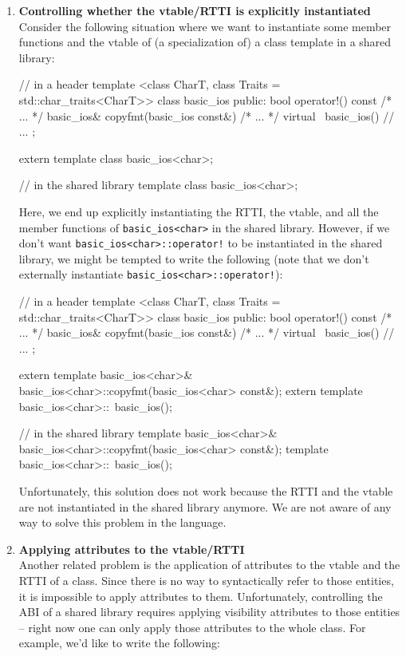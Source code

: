 \documentclass{wg21}
\newcommand{\cc}[1]{\texttt{#1}}
\begin{document}
\begin{enumerate}
  \item \textbf{Controlling whether the vtable/RTTI is explicitly instantiated}\\
  Consider the following situation where we want to instantiate some member
  functions and the vtable of (a specialization of) a class template in a
  shared library:

  \begin{cpp}
  // in a header
  template <class CharT, class Traits = std::char_traits<CharT>>
  class basic_ios {
  public:
    bool operator!() const { /* ... */ }
    basic_ios& copyfmt(basic_ios const&) { /* ... */ }
    virtual ~basic_ios() { }
    // ...
  };

  extern template class basic_ios<char>;

  // in the shared library
  template class basic_ios<char>;
  \end{cpp}

  Here, we end up explicitly instantiating the RTTI, the vtable, and all the
  member functions of \cc{basic_ios<char>} in the shared library. However, if
  we don't want \cc{basic_ios<char>::operator!} to be instantiated in the
  shared library, we might be tempted to write the following (note that we
  don't externally instantiate \cc{basic_ios<char>::operator!}):

  \begin{cpp}
  // in a header
  template <class CharT, class Traits = std::char_traits<CharT>>
  class basic_ios {
  public:
    bool operator!() const { /* ... */ }
    basic_ios& copyfmt(basic_ios const&) { /* ... */ }
    virtual ~basic_ios() { }
    // ...
  };

  extern template basic_ios<char>& basic_ios<char>::copyfmt(basic_ios<char> const&);
  extern template basic_ios<char>::~basic_ios();

  // in the shared library
  template basic_ios<char>& basic_ios<char>::copyfmt(basic_ios<char> const&);
  template basic_ios<char>::~basic_ios();
  \end{cpp}

  Unfortunately, this solution does not work because the RTTI and the vtable are
  not instantiated in the shared library anymore. We are not aware of any way to
  solve this problem in the language.

  \item \textbf{Applying attributes to the vtable/RTTI}\\
  Another related problem is the application of attributes to the vtable and the
  RTTI of a class. Since there is no way to syntactically refer to those entities,
  it is impossible to apply attributes to them. Unfortunately, controlling the
  ABI of a shared library requires applying visibility attributes to those
  entities -- right now one can only apply those attributes to the whole class.
  For example, we'd like to write the following:


\end{enumerate}
\end{document}
